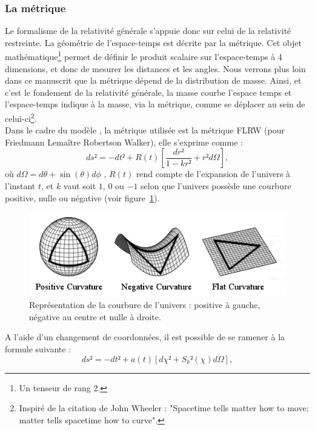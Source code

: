 \documentclass[11pt, twoside, a4paper, openright]{report}
\begin{document}
\subsubsection{La métrique}
Le formalisme de la relativité générale s'appuie donc sur celui de la relativité restreinte. La géométrie de l'espace-temps est décrite par la métrique. Cet objet mathématique\footnote{Un tenseur de rang 2.} permet de définir le produit scalaire sur l'espace-temps à 4 dimensions, et donc de mesurer les distances et les angles.
Nous verrons plus loin dans ce manuscrit que la métrique dépend de la distribution de masse. Ainsi, et c'est le fondement de la relativité générale, la masse courbe l'espace temps et l'espace-temps indique à la masse, via la métrique, comme se déplacer au sein de celui-ci\footnote{Inspiré de la citation de John Wheeler : "Spacetime tells matter how to move; matter tells spacetime how to curve".}. \\
Dans le cadre du modèle \lcdm{}, la métrique utilisée est la métrique FLRW (pour Friedmann Lemaître Robertson Walker), elle s'exprime comme :
\begin{equation}
  \label{eq:metrique1}
  ds² = - dt² + R(t) \left[ \frac{dr²}{1 - k r²} + r² d\Omega \right],
\end{equation}
où $d\Omega = d\theta + \sin(\theta) d\phi$ , $R(t)$ rend compte de l'expansion de l'univers à l'instant $t$, et $k$ vaut soit $1$, $0$ ou $-1$ selon que l'univers possède une courbure positive, nulle ou négative (voir figure~\ref{fig:curvature}).
\begin{figure}
  \centering
  \includegraphics[scale=0.6]{curvature}
  \caption{Représentation de la courbure de l'univers : positive à gauche, négative au centre et nulle à droite.}
  \label{fig:curvature}
\end{figure}
A l'aide d'un changement de coordonnées, il est possible de se ramener à la formule suivante :
\begin{equation}
  \label{eq:metrique2}
  ds² = - dt² + a(t)\left[ d\chi² + S_{k}²(\chi) d\Omega \right],
\end{equation}
\end{document}
